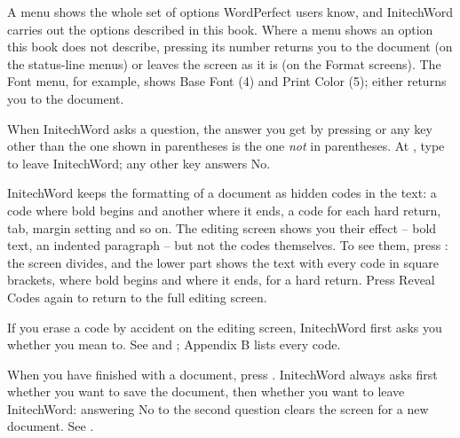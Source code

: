 A menu shows the whole set of options WordPerfect users know, and
InitechWord carries out the options described in this book.  Where a
menu shows an option this book does not describe, pressing its number
returns you to the document (on the status-line menus) or leaves the
screen as it is (on the Format screens).  The Font menu, for example,
shows Base Font (4) and Print Color (5); either returns you to the
document.

When InitechWord asks a question, the answer you get by pressing
 or any key other than the one shown in parentheses is the one
\emph{not} in parentheses.  At , type  to
leave InitechWord; any other key answers No.

InitechWord keeps the formatting of a document as hidden codes in the text:
a code where bold begins and another where it ends, a code for each hard
return, tab, margin setting and so on.  The editing screen shows you their
effect -- bold text, an indented paragraph -- but not the codes themselves.
To see them, press : the screen divides, and the
lower part shows the text with every code in square brackets, \Code{[BOLD]}
where bold begins and \Code{[bold]} where it ends, \Code{[HRt]} for a hard
return.  Press Reveal Codes again to return to the full editing screen.

If you erase a code by accident on the editing screen, InitechWord first
asks you whether you mean to.  See  and ;
Appendix B lists every code.

When you have finished with a document, press .  InitechWord
always asks first whether you want to save the document, then whether you
want to leave InitechWord: answering No to the second question clears the
screen for a new document.  See .
